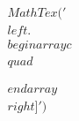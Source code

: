 \documentclass[preview]{standalone}
\begin{document}
\begin{align*}
MathTex('\\left.\\begin{array}{c}\\quad \\\\\\end{array}\\right]')
\end{align*}
\end{document}
